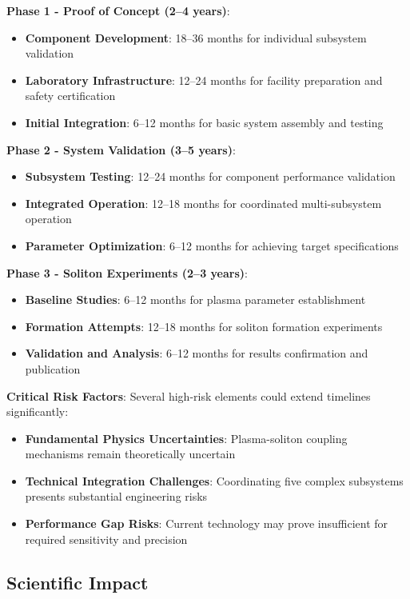 \documentclass[12pt,a4paper]{article}
\begin{document}
\textbf{Phase 1 - Proof of Concept (2--4 years)}:
\begin{itemize}
\item \textbf{Component Development}: 18--36 months for individual subsystem validation
\item \textbf{Laboratory Infrastructure}: 12--24 months for facility preparation and safety certification
\item \textbf{Initial Integration}: 6--12 months for basic system assembly and testing
\end{itemize}

\textbf{Phase 2 - System Validation (3--5 years)}:
\begin{itemize}
\item \textbf{Subsystem Testing}: 12--24 months for component performance validation
\item \textbf{Integrated Operation}: 12--18 months for coordinated multi-subsystem operation
\item \textbf{Parameter Optimization}: 6--12 months for achieving target specifications
\end{itemize}

\textbf{Phase 3 - Soliton Experiments (2--3 years)}:
\begin{itemize}
\item \textbf{Baseline Studies}: 6--12 months for plasma parameter establishment
\item \textbf{Formation Attempts}: 12--18 months for soliton formation experiments
\item \textbf{Validation and Analysis}: 6--12 months for results confirmation and publication
\end{itemize}

\textbf{Critical Risk Factors}: Several high-risk elements could extend timelines significantly:
\begin{itemize}
\item \textbf{Fundamental Physics Uncertainties}: Plasma-soliton coupling mechanisms remain theoretically uncertain
\item \textbf{Technical Integration Challenges}: Coordinating five complex subsystems presents substantial engineering risks
\item \textbf{Performance Gap Risks}: Current technology may prove insufficient for required sensitivity and precision
\end{itemize}

\subsection{Scientific Impact}
\end{document}
